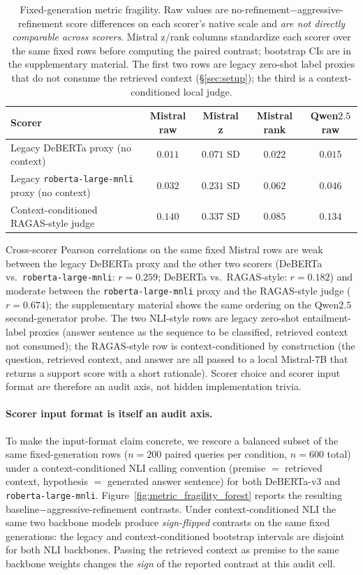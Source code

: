 \begin{table}[!htb]
\centering
\caption{Fixed-generation metric fragility. Raw values are
no-refinement$-$aggressive-refinement score differences on each
scorer's native scale and \emph{are not directly comparable across
scorers}. Mistral z/rank columns standardize each scorer over the
same fixed rows before computing the paired contrast; bootstrap CIs
are in the supplementary material. The first two rows are legacy zero-shot label
proxies that do not consume the retrieved context (\S\ref{sec:setup});
the third is a context-conditioned local judge.}
\label{tab:metric_fragility_main}
\footnotesize
\begin{tabular}{lcccc}
\toprule
Scorer & Mistral raw & Mistral z & Mistral rank & Qwen$2.5$ raw \\
\midrule
Legacy DeBERTa proxy (no context) & $0.011$ & $0.071$ SD & $0.022$ & $0.015$ \\
Legacy \texttt{roberta-large-mnli} proxy (no context) & $0.032$ & $0.231$ SD & $0.062$ & $0.046$ \\
Context-conditioned RAGAS-style judge & $0.140$ & $0.337$ SD & $0.085$ & $0.134$ \\
\bottomrule
\end{tabular}
\end{table}

Cross-scorer Pearson correlations on the same fixed Mistral rows are
weak between the legacy DeBERTa proxy and the other two scorers
(DeBERTa vs.\ \texttt{roberta-large-mnli}: $r=0.259$; DeBERTa vs.\
RAGAS-style: $r=0.182$) and moderate between the
\texttt{roberta-large-mnli} proxy and the RAGAS-style judge
($r=0.674$); the supplementary material shows the same ordering on the Qwen$2.5$
second-generator probe. The two NLI-style rows are legacy zero-shot
entailment-label proxies (answer sentence as the sequence to be
classified, retrieved context not consumed); the RAGAS-style row is
context-conditioned by construction (the question, retrieved context,
and answer are all passed to a local Mistral-$7$B that returns a
support score with a short rationale). Scorer choice and scorer input
format are therefore an audit axis, not hidden implementation trivia.

\paragraph{Scorer input format is itself an audit axis.}
To make the input-format claim concrete, we rescore a balanced subset
of the same fixed-generation rows ($n=200$ paired queries per
condition, $n=600$ total) under a context-conditioned NLI calling
convention (premise $=$ retrieved context, hypothesis $=$ generated
answer sentence) for both DeBERTa-v$3$ and
\texttt{roberta-large-mnli}.
Figure~\ref{fig:metric_fragility_forest} reports the resulting
baseline$-$aggressive-refinement contrasts. Under context-conditioned
NLI the same two backbone models produce \emph{sign-flipped}
contrasts on the same fixed generations: the legacy and
context-conditioned bootstrap intervals are disjoint for both NLI
backbones. Passing the retrieved context as premise to the same
backbone weights changes the \emph{sign} of the reported contrast at
this audit cell.

